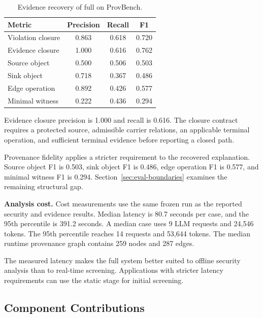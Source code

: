 \begin{table}[t]
\caption{Evidence recovery of full \system on ProvBench.}
\label{tab:evidence-recovery}
\centering
\small
\setlength{\tabcolsep}{5pt}
\renewcommand{\arraystretch}{1.12}
\begin{tabular*}{\columnwidth}{@{\extracolsep{\fill}}lccc}
\toprule
\textbf{Metric}
& \textbf{Precision}
& \textbf{Recall}
& \textbf{F1} \\
\midrule
Violation closure
& 0.863 & 0.618 & 0.720 \\

Evidence closure
& 1.000 & 0.616 & 0.762 \\
\addlinespace[2pt]

Source object
& 0.500 & 0.506 & 0.503 \\

Sink object
& 0.718 & 0.367 & 0.486 \\

Edge operation
& 0.892 & 0.426 & 0.577 \\

Minimal witness
& 0.222 & 0.436 & 0.294 \\
\bottomrule
\end{tabular*}
\end{table}

Evidence closure precision is 1.000 and recall is 0.616. The closure contract
requires a protected source, admissible carrier relations, an applicable
terminal operation, and sufficient terminal evidence before reporting a
closed path.

Provenance fidelity applies a stricter requirement to the recovered
explanation. Source object F1 is 0.503, sink object F1 is 0.486, edge
operation F1 is 0.577, and minimal witness F1 is 0.294.
Section~\ref{sec:eval-boundaries} examines the remaining structural gap.


\textbf{Analysis cost.}
Cost measurements use the same frozen run as the reported security and
evidence results. Median latency is 80.7 seconds per case, and the 95th
percentile is 391.2 seconds. A median case uses 9 LLM requests and 24,546
tokens. The 95th percentile reaches 14 requests and 53,644 tokens. The median
runtime provenance graph contains 259 nodes and 287 edges.

The measured latency makes the full system better suited to offline security
analysis than to real-time screening. Applications with stricter latency
requirements can use the static stage for initial screening.


\subsection{Component Contributions}
\label{sec:eval-ablation}


